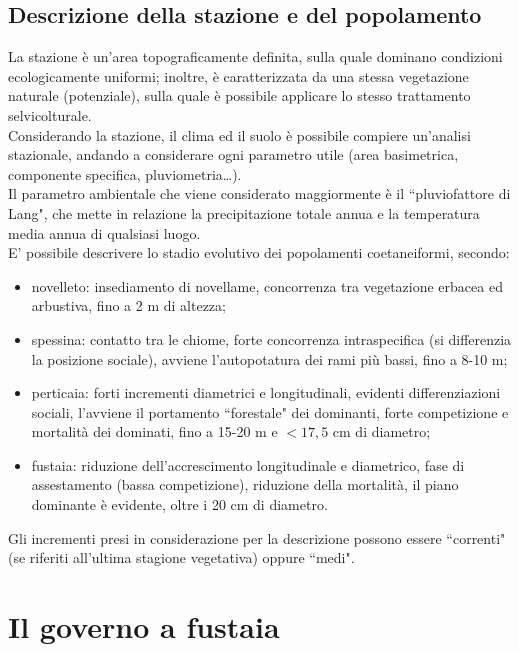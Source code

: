 \documentclass{article}
\begin{document}
\subsection{Descrizione della stazione e del popolamento}
La stazione è un'area topograficamente definita, sulla quale dominano condizioni ecologicamente uniformi; inoltre, è caratterizzata da una stessa vegetazione naturale (potenziale), sulla quale è possibile applicare lo stesso trattamento selvicolturale.\\
Considerando la stazione, il clima ed il suolo è possibile compiere un'analisi stazionale, andando a considerare ogni parametro utile (area basimetrica, componente specifica, pluviometria\dots).\\
Il parametro ambientale che viene considerato maggiormente è il ``pluviofattore di Lang", che mette in relazione la precipitazione totale annua e la temperatura media annua di qualsiasi luogo.\\
E' possibile descrivere lo stadio evolutivo dei popolamenti coetaneiformi, secondo:
\begin{itemize}
    \item novelleto: insediamento di novellame, concorrenza tra vegetazione erbacea ed arbustiva, fino a 2 m di altezza;
    \item spessina: contatto tra le chiome, forte concorrenza intraspecifica (si differenzia la posizione sociale), avviene l'autopotatura dei rami più bassi, fino a 8-10 m;
    \item perticaia: forti incrementi diametrici e longitudinali, evidenti differenziazioni sociali, l'avviene il portamento ``forestale" dei dominanti, forte competizione e mortalità dei dominati, fino a 15-20 m e $<17,5$ cm di diametro;
    \item fustaia: riduzione dell'accrescimento longitudinale e diametrico, fase di assestamento (bassa competizione), riduzione della mortalità, il piano dominante è evidente, oltre i 20 cm di diametro.
\end{itemize}
Gli incrementi presi in considerazione per la descrizione possono essere ``correnti" (se riferiti all'ultima stagione vegetativa) oppure ``medi".

\section{Il governo a fustaia}
\end{document}
